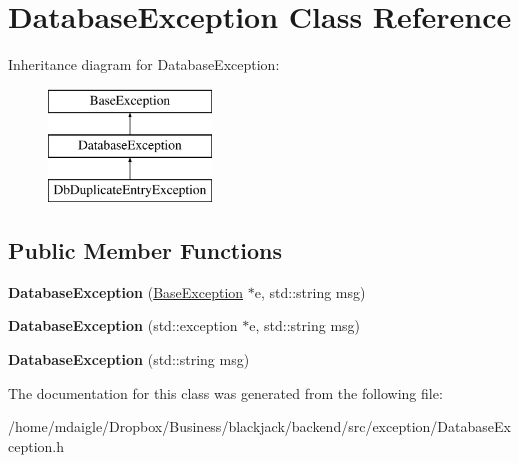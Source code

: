 \hypertarget{classDatabaseException}{
\section{\-Database\-Exception \-Class \-Reference}
\label{classDatabaseException}
}
\-Inheritance diagram for \-Database\-Exception\-:\begin{figure}[H]
\begin{center}
\leavevmode
\includegraphics[height=3.000000cm]{classDatabaseException}
\end{center}
\end{figure}
\subsection*{\-Public \-Member \-Functions}
\begin{DoxyCompactItemize}
\item 
\hypertarget{classDatabaseException_ad898a38d3d06a7bc42fa1fe0c5a9262b}{
{\bfseries \-Database\-Exception} (\hyperlink{classBaseException}{\-Base\-Exception} $\ast$e, std\-::string msg)}
\label{classDatabaseException_ad898a38d3d06a7bc42fa1fe0c5a9262b}

\item 
\hypertarget{classDatabaseException_af6b4c448c7c643aae04bef0e23210338}{
{\bfseries \-Database\-Exception} (std\-::exception $\ast$e, std\-::string msg)}
\label{classDatabaseException_af6b4c448c7c643aae04bef0e23210338}

\item 
\hypertarget{classDatabaseException_abd011b3c25856cbb70cb28c8b4219613}{
{\bfseries \-Database\-Exception} (std\-::string msg)}
\label{classDatabaseException_abd011b3c25856cbb70cb28c8b4219613}

\end{DoxyCompactItemize}


\-The documentation for this class was generated from the following file\-:\begin{DoxyCompactItemize}
\item 
/home/mdaigle/\-Dropbox/\-Business/blackjack/backend/src/exception/\-Database\-Exception.\-h\end{DoxyCompactItemize}
